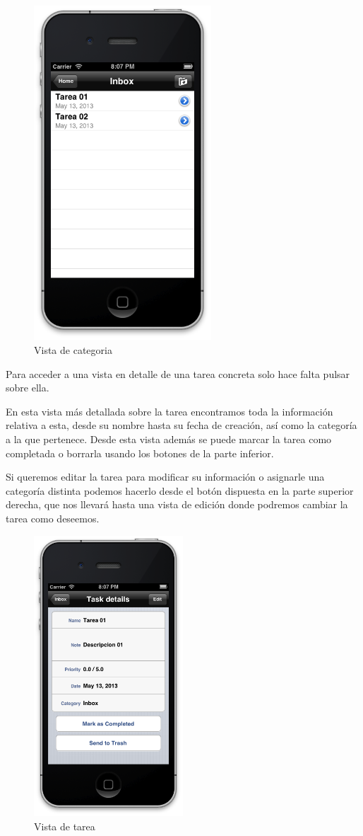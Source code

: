 \documentclass[parskip=half*]{scrartcl}
\begin{document}
\begin{figure}[h]
	\centering
	\includegraphics[height=12.5cm]{category.png}
	\caption{Vista de categoria}
\end{figure}

Para acceder a una vista en detalle de una tarea concreta solo hace falta pulsar sobre ella.

En esta vista más detallada sobre la tarea encontramos toda la informaci\'on relativa a esta, desde su nombre hasta su fecha de creaci\'on, as\'i como la categor\'ia a la que pertenece. Desde esta vista adem\'as se puede marcar la tarea como completada o borrarla usando los botones de la parte inferior.

Si queremos editar la tarea para modificar su informaci\'on o asignarle una categor\'ia distinta podemos hacerlo desde el bot\'on dispuesta en la parte superior derecha, que nos llevar\'a hasta una vista de edici\'on donde podremos cambiar la tarea como deseemos.

\begin{figure}[h]
	\centering
	\includegraphics[height=10.5cm]{task.png}
	\caption{Vista de tarea}
\end{figure}
\end{document}
